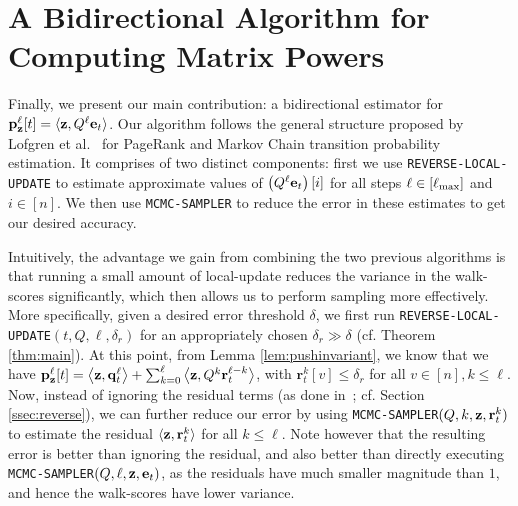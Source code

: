 
\section{A Bidirectional Algorithm for Computing Matrix Powers}
\label{ssec:bidiralgo}

Finally, we present our main contribution: a bidirectional estimator for ${\mathbf{p}}_\mathbf{z}^{\ell}[t] = \langle\mathbf{z},Q^{\ell}\mathbf{e}_t\rangle$. 
Our algorithm follows the general structure proposed by Lofgren et al.~\cite{Lofgren2014,banerjee2015fast} for PageRank and Markov Chain transition probability estimation.
It comprises of two distinct components: first we use  \texttt{REVERSE-LOCAL-UPDATE} to estimate approximate values of $\left(Q^{\ell}\mathbf{e}_t\right)[i]$ for all steps $\ell \in[\ell_{\max}]$ and $i\in[n]$. 
We then use \texttt{MCMC-SAMPLER} to reduce the error in these estimates to get our desired accuracy.


Intuitively, the advantage we gain from combining the two previous algorithms is that running a small amount of local-update reduces the variance in the walk-scores significantly, which then allows us to perform sampling more effectively.
More specifically, given a desired error threshold $\delta$, we first run \texttt{REVERSE-LOCAL-UPDATE}$(t,Q,\ell,\delta_r)$ for an appropriately chosen $\delta_r\gg\delta$ (cf. Theorem \ref{thm:main}). 
At this point, from Lemma \ref{lem:pushinvariant}, we know that we have
${\mathbf{p}}_\mathbf{z}^{\ell}[t] = \left< \mathbf{z}, \mathbf{q}_t^{\ell} \right> + \sum_{k=0}^{\ell} \left< \mathbf{z}, Q^k\mathbf{r}_t^{\ell-k} \right>$, with $\mathbf{r}_t^{k}[v]\leq\delta_r$ for all $v\in[n],k\leq\ell$.
Now, instead of ignoring the residual terms (as done in~\cite{andersen2007local,lee2014asynchronous}; cf. Section \ref{ssec:reverse}), we can further reduce our error by using \texttt{MCMC-SAMPLER}$(Q,k,\mathbf{z},\mathbf{r}_t^k)$ to estimate the residual $\langle\mathbf{z},\mathbf{r}_t^k\rangle$ for all $k\leq\ell$.
Note however that the resulting error is better than ignoring the residual, and also better than directly executing \texttt{MCMC-SAMPLER}$(Q,\ell,\mathbf{z},\mathbf{e}_{t})$, as the residuals have much smaller magnitude than $1$, and hence the walk-scores have lower variance.

